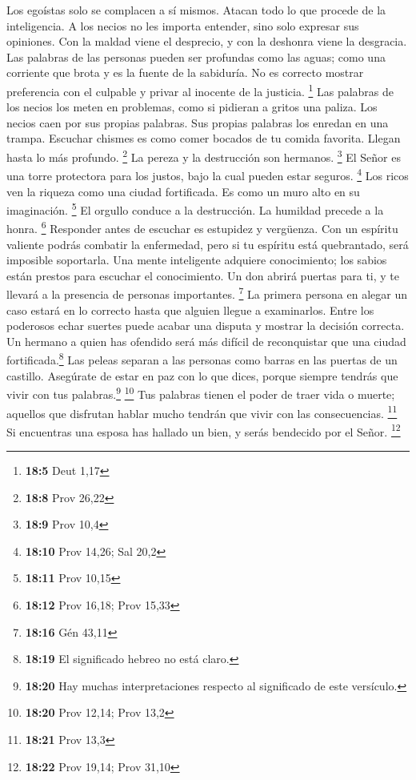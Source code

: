  Los egoístas solo se complacen a sí mismos. Atacan todo
lo que procede de la inteligencia.  A los necios no les
importa entender, sino solo expresar sus opiniones.  Con
la maldad viene el desprecio, y con la deshonra viene la desgracia.
 Las palabras de las personas pueden ser profundas como
las aguas; como una corriente que brota y es la fuente de la sabiduría.
 No es correcto mostrar preferencia con el culpable y
privar al inocente de la justicia. \footnote{\textbf{18:5} Deut 1,17}
 Las palabras de los necios los meten en problemas, como
si pidieran a gritos una paliza.  Los necios caen por sus
propias palabras. Sus propias palabras los enredan en una trampa.
 Escuchar chismes es como comer bocados de tu comida
favorita. Llegan hasta lo más profundo. \footnote{\textbf{18:8} Prov
  26,22}  La pereza y la destrucción son hermanos.
\footnote{\textbf{18:9} Prov 10,4}  El Señor es una torre
protectora para los justos, bajo la cual pueden estar seguros.
\footnote{\textbf{18:10} Prov 14,26; Sal 20,2}  Los ricos
ven la riqueza como una ciudad fortificada. Es como un muro alto en su
imaginación. \footnote{\textbf{18:11} Prov 10,15}  El
orgullo conduce a la destrucción. La humildad precede a la honra.
\footnote{\textbf{18:12} Prov 16,18; Prov 15,33} 
Responder antes de escuchar es estupidez y vergüenza. 
Con un espíritu valiente podrás combatir la enfermedad, pero si tu
espíritu está quebrantado, será imposible soportarla. 
Una mente inteligente adquiere conocimiento; los sabios están prestos
para escuchar el conocimiento.  Un don abrirá puertas
para ti, y te llevará a la presencia de personas importantes.
\footnote{\textbf{18:16} Gén 43,11}  La primera persona
en alegar un caso estará en lo correcto hasta que alguien llegue a
examinarlos.  Entre los poderosos echar suertes puede
acabar una disputa y mostrar la decisión correcta.  Un
hermano a quien has ofendido será más difícil de reconquistar que una
ciudad fortificada.\footnote{\textbf{18:19} El significado hebreo no
  está claro.} Las peleas separan a las personas como barras en las
puertas de un castillo.  Asegúrate de estar en paz con lo
que dices, porque siempre tendrás que vivir con tus palabras.\footnote{\textbf{18:20}
  Hay muchas interpretaciones respecto al significado de este versículo.}
\footnote{\textbf{18:20} Prov 12,14; Prov 13,2}  Tus
palabras tienen el poder de traer vida o muerte; aquellos que disfrutan
hablar mucho tendrán que vivir con las consecuencias. \footnote{\textbf{18:21}
  Prov 13,3}  Si encuentras una esposa has hallado un
bien, y serás bendecido por el Señor. \footnote{\textbf{18:22} Prov
  19,14; Prov 31,10}

